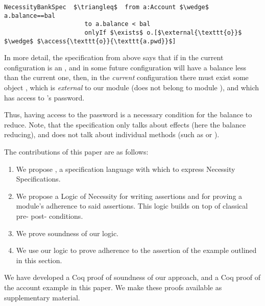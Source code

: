 \begin{lstlisting}[language = Chainmail, mathescape=true, frame=lines]
NecessityBankSpec  $\triangleq$  from a:Account $\wedge$ a.balance==bal
                      to a.balance < bal
                      onlyIf $\exists$ o.[$\external{\texttt{o}}$ $\wedge$ $\access{\texttt{o}}{\texttt{a.pwd}}$]
\end{lstlisting}
 
  
 In more detail, the specification from above says that if in the current
 configuration  is an ,
 and in some future configuration  will have a balance less than the current one, then, in the \emph{current} configuration
 there must exist some object , which is \emph{external} to our module (does not belong to module
 ), and which has access to 's password.
 
 
 Thus, having access to the password is a necessary condition for the balance to reduce.
 Note, that the specification only talks about effects (here the balance reducing), and does not
 talk about individual methods (such as  or ).
 
   
 The contributions of this paper are as follows:
 
 \begin{enumerate}
 \item
 We propose \SpecO, a specification language with which to
express Necessity Specifications. 
 \item
  We propose a Logic of Necessity for writing assertions and for proving a module's adherence to said assertions.
 This logic builds on top of classical pre- post- conditions.
 \item
 We prove soundness of our logic.  
 \item
 We use our logic to prove adherence to the assertion of the example
outlined  in this section.
 \end{enumerate}
 
 We have developed a Coq proof of soundness of our approach, and a Coq proof of the
 account example in this paper. We make these proofs available as supplementary material.


